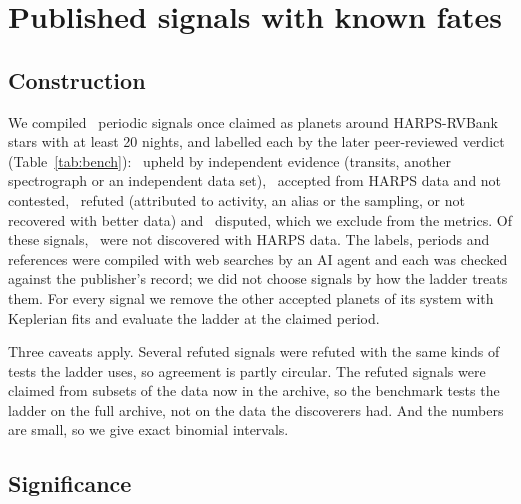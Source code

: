 \section{Published signals with known fates}
\label{sec:bench}

\subsection{Construction}

We compiled \nmBenchN\ periodic signals once claimed as planets around HARPS-RVBank
stars with at least 20 nights, and labelled each by the later peer-reviewed verdict
(Table~\ref{tab:bench}): \nmBenchUI\ upheld by independent evidence (transits, another
spectrograph or an independent data set), \nmBenchUH\ accepted from HARPS data and not
contested, \nmBenchR\ refuted (attributed to activity, an alias or the sampling, or not
recovered with better data) and \nmBenchD\ disputed, which we exclude from the metrics.
Of these signals, \nmBenchNotHarps\ were not discovered with HARPS data. The labels, periods
and references were compiled with web searches by an AI agent and each was checked
against the publisher's record; we did not choose signals by how the ladder treats
them. For every signal we remove the other accepted planets of its system with
Keplerian fits and evaluate the ladder at the claimed period.

Three caveats apply. Several refuted signals were refuted with the same kinds of
tests the ladder uses, so agreement is partly circular. The refuted signals were
claimed from subsets of the data now in the archive, so the benchmark tests the
ladder on the full archive, not on the data the discoverers had. And the numbers are
small, so we give exact binomial intervals.

\subsection{Significance}

